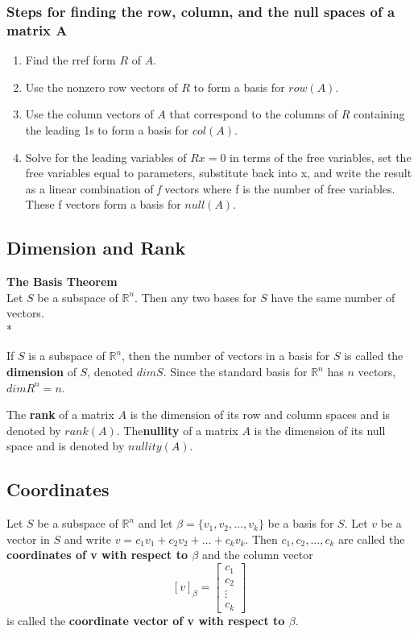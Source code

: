 \subsubsection*{Steps for finding the row, column, and the null spaces of a matrix A}
\begin{enumerate}
    \item Find the rref form $R$ of $A$.
    \item Use the nonzero row vectors of $R$ to form a basis for $row(A)$.
    \item Use the column vectors of $A$ that correspond to the columns of $R$ containing the leading 1s to form a basis for $col(A)$.
    \item Solve for the leading variables of $Rx = 0$ in terms of the free variables, set the free variables equal to parameters, substitute back into x, and write the result as a linear combination of \textit{f} vectors where f is the number of free variables. These f vectors form a basis for $null(A)$.
\end{enumerate}
\subsection*{Dimension and Rank}
\textbf{The Basis Theorem}\\
Let $S$ be a subspace of $\mathbb{R}^n$. Then any two bases for $S$ have the same number of vectors.\\* 

If $S$ is a subspace of $\mathbb{R}^n$, then the number of vectors in a basis for $S$ is called the \textbf{dimension} of $S$, denoted $dim S$.
Since the standard basis for $\mathbb{R}^n$ has $n$ vectors, $dim R^n = n$. 

The \textbf{rank} of a matrix $A$ is the dimension of its row and column spaces and is denoted by $rank(A)$.
The\textbf{nullity} of a matrix $A$ is the dimension of its null space and is denoted by $nullity(A)$.

\subsection*{Coordinates}
Let $S$ be a subspace of $\mathbb{R}^n$ and let $\beta = \{v_1, v_2, \dots, v_k\}$ be a basis for $S$. Let $v$ be a vector in $S$ and write $v = c_1v_1 + c_2v_2 + \dots + c_kv_k$. Then $c_1, c_2, \dots, c_k$ are called the \textbf{coordinates of v with respect to $\beta$} and the column vector
$$[v]_\beta = \begin{bmatrix}
    c_1\\c_2\\\vdots\\c_k
\end{bmatrix}$$
is called the \textbf{coordinate vector of v with respect to $\beta$}.
